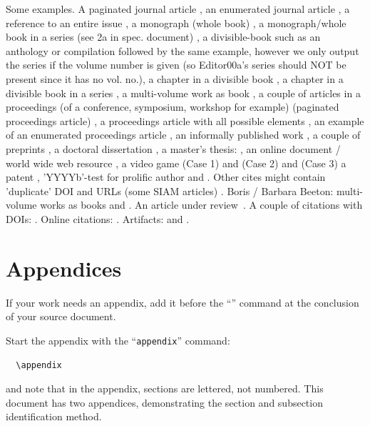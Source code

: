   Some examples.  A paginated journal article \cite{Abril07}, an
  enumerated journal article \cite{Cohen07}, a reference to an entire
  issue \cite{JCohen96}, a monograph (whole book) \cite{Kosiur01}, a
  monograph/whole book in a series (see 2a in spec. document)
  \cite{Harel79}, a divisible-book such as an anthology or compilation
  \cite{Editor00} followed by the same example, however we only output
  the series if the volume number is given \cite{Editor00a} (so
  Editor00a's series should NOT be present since it has no vol. no.),
  a chapter in a divisible book \cite{Spector90}, a chapter in a
  divisible book in a series \cite{Douglass98}, a multi-volume work as
  book \cite{Knuth97}, a couple of articles in a proceedings (of a
  conference, symposium, workshop for example) (paginated proceedings
  article) \cite{Andler79, Hagerup1993}, a proceedings article with
  all possible elements \cite{Smith10}, an example of an enumerated
  proceedings article \cite{VanGundy07}, an informally published work
  \cite{Harel78}, a couple of preprints \cite{Bornmann2019,
    AnzarootPBM14}, a doctoral dissertation \cite{Clarkson85}, a
  master's thesis: \cite{anisi03}, an online document / world wide web
  resource \cite{Thornburg01, Ablamowicz07, Poker06}, a video game
  (Case 1) \cite{Obama08} and (Case 2) \cite{Novak03} 
  and (Case 3) a patent \cite{JoeScientist001}, 'YYYYb'-test for prolific author
  \cite{SaeediMEJ10} and \cite{SaeediJETC10}. Other cites might
  contain 'duplicate' DOI and URLs (some SIAM articles)
  \cite{Kirschmer:2010:AEI:1958016.1958018}. Boris / Barbara Beeton:
  multi-volume works as books \cite{MR781536} and \cite{MR781537}. An article under
  review~\cite{Baggett2025}. A
  couple of citations with DOIs:
  \cite{Kirschmer:2010:AEI:1958016.1958018}. Online
  citations: \cite{TUGInstmem, Thornburg01, CTANacmart}.
  Artifacts: \cite{R} and \cite{UMassCitations}.


\section{Appendices}

If your work needs an appendix, add it before the
``\verb||'' command at the conclusion of your source
document.

Start the appendix with the ``\verb|appendix|'' command:
\begin{verbatim}
  \appendix
\end{verbatim}
and note that in the appendix, sections are lettered, not
numbered. This document has two appendices, demonstrating the section
and subsection identification method.
